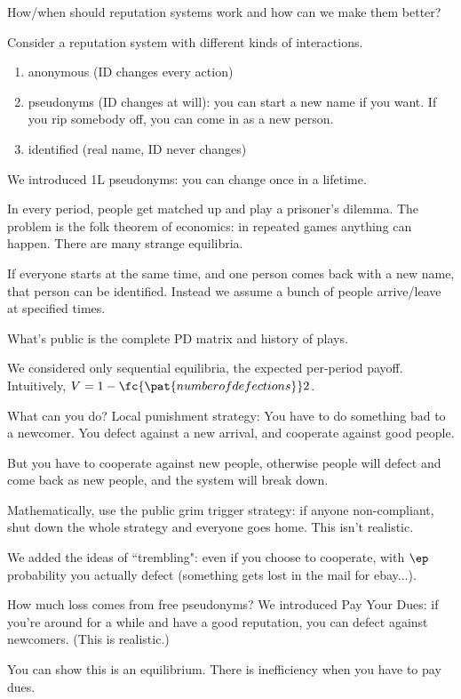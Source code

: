How/when should reputation systems work and how can we make them better?


Consider a reputation system with different kinds of interactions.
\begin{enumerate}
\item
anonymous (ID changes every action)
\item
pseudonyms (ID changes at will): you can start a new name if you want. If you rip somebody off, you can come in as a new person.
\item
identified (real name, ID never changes)
\end{enumerate}

We introduced 1L pseudonyms: you can change once in a lifetime. 

In every period, people get matched up and play a prisoner's dilemma. The problem is the folk theorem of economics: in repeated games anything can happen. There are many strange equilibria. 

If everyone starts at the same time, and one person comes back with a new name, that person can be identified. Instead we assume a bunch of people arrive/leave at specified times. 

What's public is the complete PD matrix and history of plays.

We considered only sequential equilibria, the expected per-period payoff.
Intuitively, $V=1-\fc{\pat{number of defections}}2$.

What can you do? Local punishment strategy: You have to do something bad to a newcomer. You defect against a new arrival, and cooperate against good people.

But you have to cooperate against new people, otherwise people will defect and come back as new people, and the system will break down.

Mathematically, use the public grim trigger strategy: if anyone non-compliant, shut down the whole strategy and everyone goes home. This isn't realistic.

We added the ideas of ``trembling": even if you choose to cooperate, with $\ep$ probability you actually defect (something gets lost in the mail for ebay...).

How much loss comes from free pseudonyms? We introduced Pay Your Dues: if you're around for a while and have a good reputation, you can defect against newcomers. (This is realistic.)

You can show this is an equilibrium.
There is inefficiency when you have to pay dues. 

